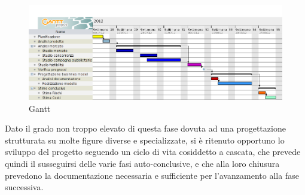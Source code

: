 \vspace*{0.5cm}

\begin{figure}[H]
\centering
\includegraphics[scale=0.4]{images/Gantt.png}
\caption{Gantt}
\end{figure}

\vspace*{0.5cm}

Dato il grado non troppo elevato di questa fase dovuta ad una progettazione strutturata su molte figure diverse e specializzate, si è ritenuto opportuno lo sviluppo del progetto seguendo un ciclo di vita cosiddetto a cascata, che prevede quindi il susseguirsi delle varie fasi auto-conclusive, e che alla loro chiusura prevedono la documentazione necessaria e sufficiente per l'avanzamento alla fase successiva.


